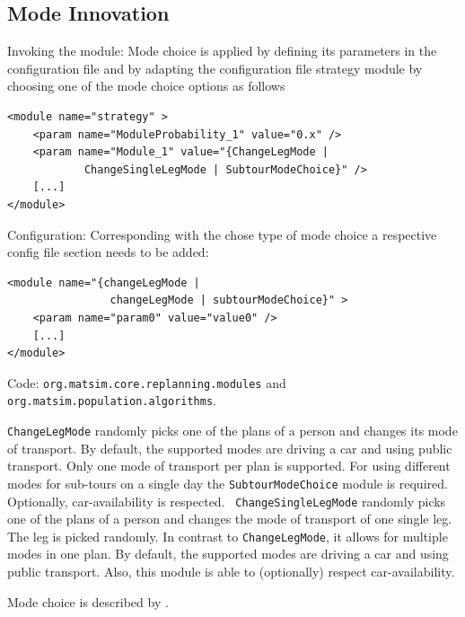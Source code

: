 \subsection{Mode Innovation}
\label{sec:modechoice}
\begin{compactitem}
\item Invoking the module: Mode choice is applied by defining its parameters in the configuration file and by adapting the configuration file strategy module by choosing one of the mode choice options as follows
\begin{lstlisting}
<module name="strategy" >
    <param name="ModuleProbability_1" value="0.x" />
    <param name="Module_1" value="{ChangeLegMode |
    		ChangeSingleLegMode | SubtourModeChoice}" />
    [...]
</module>
\end{lstlisting}
%
\item Configuration: Corresponding with the chose type of mode choice a respective config file section needs to be added:
%
\begin{lstlisting}
<module name="{changeLegMode |
				changeLegMode | subtourModeChoice}" >
    <param name="param0" value="value0" />
    [...]
</module>
\end{lstlisting}
%
\item Code: \lstinline|org.matsim.core.replanning.modules| and \lstinline|org.matsim.population.algorithms|.
\end{compactitem}

\lstinline|ChangeLegMode| randomly picks one of the plans of a person and changes its mode of transport. By default, the supported modes are driving a car and using public transport. Only one mode of transport per plan is supported. For using different modes for sub-tours on a single day the \lstinline|SubtourModeChoice| module is required. Optionally, car-availability is respected. \lstinline| ChangeSingleLegMode| randomly picks one of the plans of a person and changes the mode of transport of one single leg. The leg is picked randomly. In contrast to \lstinline|ChangeLegMode|, it allows for multiple modes in one plan. By default, the supported modes are driving a car and using public transport. Also, this module is able to (optionally) respect car-availability.

Mode choice is described by \citet[][]{RieserEtAl_TRR_2009, MeisterEtAl_WCTRS_2010, CiariEtAl_STRC_2008, CiariEtAl_STRC_2007}.

